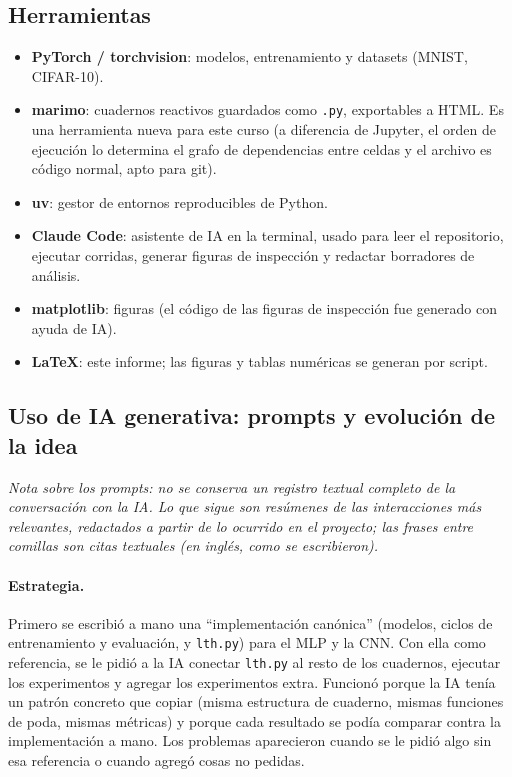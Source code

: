 \documentclass[11pt]{article}
\begin{document}
\subsection{Herramientas}
\begin{itemize}[nosep]
    \item \textbf{PyTorch / torchvision}: modelos, entrenamiento y datasets (MNIST, CIFAR-10).
    \item \textbf{marimo}: cuadernos reactivos guardados como \texttt{.py}, exportables a HTML. Es una herramienta nueva para este curso (a diferencia de Jupyter, el orden de ejecución lo determina el grafo de dependencias entre celdas y el archivo es código normal, apto para git).
    \item \textbf{uv}: gestor de entornos reproducibles de Python.
    \item \textbf{Claude Code}: asistente de IA en la terminal, usado para leer el repositorio, ejecutar corridas, generar figuras de inspección y redactar borradores de análisis.
    \item \textbf{matplotlib}: figuras (el código de las figuras de inspección fue generado con ayuda de IA).
    \item \textbf{\LaTeX}: este informe; las figuras y tablas numéricas se generan por script.
\end{itemize}

\subsection{Uso de IA generativa: prompts y evolución de la idea}
\textit{Nota sobre los prompts: no se conserva un registro textual completo de la conversación con la IA. Lo que sigue son resúmenes de las interacciones más relevantes, redactados a partir de lo ocurrido en el proyecto; las frases entre comillas son citas textuales (en inglés, como se escribieron).}

\paragraph{Estrategia.} Primero se escribió a mano una ``implementación canónica'' (modelos, ciclos de entrenamiento y evaluación, y \texttt{lth.py}) para el MLP y la CNN. Con ella como referencia, se le pidió a la IA conectar \texttt{lth.py} al resto de los cuadernos, ejecutar los experimentos y agregar los experimentos extra. Funcionó porque la IA tenía un patrón concreto que copiar (misma estructura de cuaderno, mismas funciones de poda, mismas métricas) y porque cada resultado se podía comparar contra la implementación a mano. Los problemas aparecieron cuando se le pidió algo sin esa referencia o cuando agregó cosas no pedidas.
\end{document}
